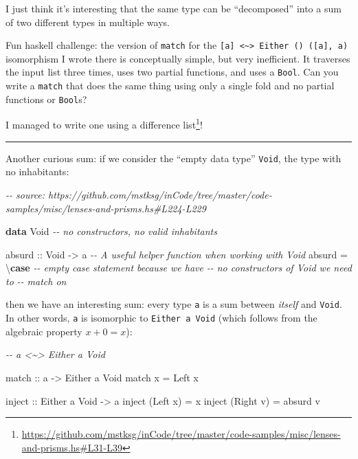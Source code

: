 \documentclass[]{article}
\newenvironment{Shaded}{}{}
\newcommand{\CommentTok}[1]{\textcolor[rgb]{0.38,0.63,0.69}{\textit{#1}}}
\newcommand{\DataTypeTok}[1]{\textcolor[rgb]{0.56,0.13,0.00}{#1}}
\newcommand{\KeywordTok}[1]{\textcolor[rgb]{0.00,0.44,0.13}{\textbf{#1}}}
\newcommand{\NormalTok}[1]{#1}
\newcommand{\OtherTok}[1]{\textcolor[rgb]{0.00,0.44,0.13}{#1}}
\renewcommand{\href}[2]{#2\footnote{\url{#1}}}
\begin{document}
I just think it's interesting that the same type can be ``decomposed'' into a
sum of two different types in multiple ways.

Fun haskell challenge: the version of \texttt{match} for the
\texttt{{[}a{]}\ \textless{}\textasciitilde{}\textgreater{}\ Either\ ()\ ({[}a{]},\ a)}
isomorphism I wrote there is conceptually simple, but very inefficient. It
traverses the input list three times, uses two partial functions, and uses a
\texttt{Bool}. Can you write a \texttt{match} that does the same thing using
only a single fold and no partial functions or \texttt{Bool}s?

I managed to write one
\href{https://github.com/mstksg/inCode/tree/master/code-samples/misc/lenses-and-prisms.hs\#L31-L39}{using
a difference list}!

\begin{center}\rule{0.5\linewidth}{\linethickness}\end{center}

Another curious sum: if we consider the ``empty data type'' \texttt{Void}, the
type with no inhabitants:

\begin{Shaded}
\begin{Highlighting}[]
\CommentTok{{-}{-} source: https://github.com/mstksg/inCode/tree/master/code{-}samples/misc/lenses{-}and{-}prisms.hs\#L224{-}L229}

\KeywordTok{data} \DataTypeTok{Void}           \CommentTok{{-}{-} no constructors, no valid inhabitants}

\OtherTok{absurd ::} \DataTypeTok{Void} \OtherTok{{-}>}\NormalTok{ a     }\CommentTok{{-}{-} A useful helper function when working with \textasciigrave{}Void\textasciigrave{}}
\NormalTok{absurd }\OtherTok{=}\NormalTok{ \textbackslash{}}\KeywordTok{case} \CommentTok{{-}{-} empty case statement because we have}
               \CommentTok{{-}{-} no constructors of \textquotesingle{}Void\textquotesingle{} we need to}
               \CommentTok{{-}{-} match on}
\end{Highlighting}
\end{Shaded}

then we have an interesting sum: every type \texttt{a} is a sum between
\emph{itself} and \texttt{Void}. In other words, \texttt{a} is isomorphic to
\texttt{Either\ a\ Void} (which follows from the algebraic property
\(x + 0 = x\)):

\begin{Shaded}
\begin{Highlighting}[]
\CommentTok{{-}{-} a <\textasciitilde{}> Either a Void}

\OtherTok{match ::}\NormalTok{ a }\OtherTok{{-}>} \DataTypeTok{Either}\NormalTok{ a }\DataTypeTok{Void}
\NormalTok{match x }\OtherTok{=} \DataTypeTok{Left}\NormalTok{ x}

\OtherTok{inject ::} \DataTypeTok{Either}\NormalTok{ a }\DataTypeTok{Void} \OtherTok{{-}>}\NormalTok{ a}
\NormalTok{inject (}\DataTypeTok{Left}\NormalTok{  x) }\OtherTok{=}\NormalTok{ x}
\NormalTok{inject (}\DataTypeTok{Right}\NormalTok{ v) }\OtherTok{=}\NormalTok{ absurd v}
\end{Highlighting}
\end{Shaded}
\end{document}
